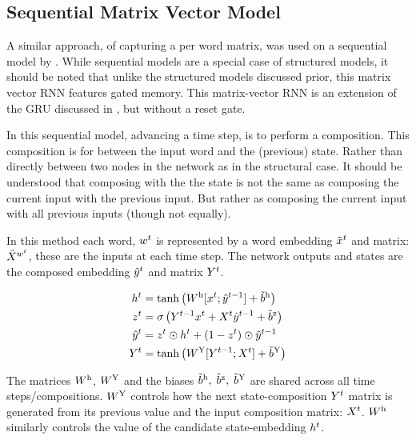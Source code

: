 \documentclass[12pt,parskip]{komatufte}
\begin{document}
\subsection{Sequential Matrix Vector Model}
A similar approach, of capturing a per word matrix, 
was used on a sequential model by .
While sequential models are a special case of structured models,
it should be noted that unlike the structured models discussed prior,
this matrix vector RNN features gated memory.
This matrix-vector RNN is an extension of the GRU discussed in , but without a reset gate.


In this sequential model, advancing a time step, is to perform a composition.
This composition is for between the input word and the (previous) state.
Rather than directly between two nodes in the network as in the structural case.
It should be understood that composing with the the state is not the same as composing the current input with the previous input.
But rather as composing the current input with all previous inputs (though not equally).

In this method each word, $\n w_t$ is represented by a word embedding $\nv x_{t}$ and matrix: $\nv X_{\n w_t}$, these are the inputs at each time step.
The network outputs and states are the composed embedding $\n \hat{y}_t$ and matrix $\n Y_t$.


 

\begin{align}
\n h_t &= \tanh\left(\d W_h [\n x_t; \n \hat{y}_{t-1}] + \dv b_h \right)\\
\n z_t &= \sigma\left(\n Y_{t-1} \n x_t + \n X_t \n \hat{y}_{t-1} + \dv b_z \right)\\
%
\n \hat{y}_t &= \n z_t \odot \n h_t + (1 - \n z_t) \odot \n \hat{y}_{t-1} \\
\n Y_t &= \tanh \left( \d W_Y [\n Y_{t-1}; \n X_t] + \dv b_Y \right)
\end{align}



The matrices $\d W_h$, $\d W_Y$ and the biases $\dv b_h,\; \dv b_z,\; \dv b_Y$ are shared across all time steps/compositions.
$\d W_Y$ controls how the next state-composition $\n Y_t$ matrix is generated from its previous value and the input composition matrix: $\n X_t$.
$\d W_h$ similarly controls the value of the candidate state-embedding $\n h_t$.
\end{document}
